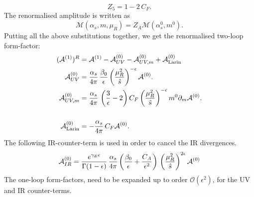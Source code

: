 \begin{equation}
	Z_5 = 1- 2\, C_F.
\end{equation}
The renormalised amplitude is written as
\begin{equation}
	\mathcal M  (\alpha_s, m, \mu_R) = Z_A \mathcal M( \alpha_s^0, m^0).
\end{equation}
Putting all the above substitutions together, we get the renormalised two-loop form-factor:
\begin{align}
	( \mathcal A ^{(1)})^R &= 	\mathcal A ^{(1)} -	\mathcal A_{UV} ^{(0)}- 	\mathcal A_{UV, m} ^{(0)} + \mathcal A_{\text{Larin}} ^{(0)}   \\
	\mathcal A_{UV} ^{(0)} &= \frac{\alpha_s}{4 \pi}\,\frac{\beta_0}{\epsilon} \left( \frac{\mu_R^2}{\hat s} \right) ^{ -\epsilon} 	\mathcal A ^{(0)}.  \nonumber \\
	\mathcal A_{UV, m} ^{(0)} &= \frac{\alpha_s}{4 \pi} \, \left( \frac{3}{\epsilon} -2\right) C_F \left( \frac{\mu_R^2}{\hat s} \right) ^{ -\epsilon} m^0 \partial_m \mathcal A^{(0)} . \nonumber \\
	\\
	\mathcal	A_{\text{Larin}} ^{(0)}  &= - \frac{\alpha_s}{4 \pi} \, C_F  \mathcal A ^{(0)} .\nonumber
\end{align}
The following IR-counter-term is used in order to cancel the IR divergences.
\begin{equation}
	\mathcal A_{IR} ^{(0)}  = \frac{e^{\gamma_E \epsilon}}{\Gamma(1-\epsilon)} \, \frac{\alpha_s}{4 \pi} \left( \frac{\beta_0}{\epsilon} + \frac{ C_A}{\epsilon^2} \right)  \, \left(  \frac{\mu_R^2}{\hat s}\right) ^{2\epsilon} \mathcal A ^{(0)}
\end{equation}
The one-loop form-factors, need to be expanded up to order $ \mathcal O(\epsilon^2) $, for the UV and IR counter-terms.
